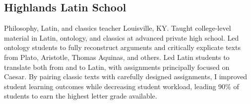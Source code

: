 \subsection{Highlands Latin School}
{}
{Philosophy, Latin, and classics teacher}
{Louisville, KY. Taught college-level material in Latin, ontology, and classics at advanced private high school. 
	Led ontology students to fully reconstruct arguments 
	and critically explicate texts from Plato, Aristotle, Thomas Aquinas, and others. 
	Led Latin students to translate both from and to Latin, 
	with assignments principally focused on Caesar. 
	By pairing classic texts with carefully designed assignments, 
	I improved student learning outcomes 
	while decreasing student workload, 
	leading 90\% of students to earn the highest letter grade available.}

